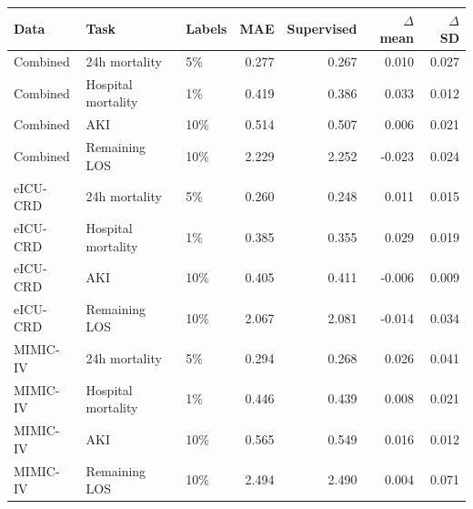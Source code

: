 \begin{tabular}{lllrrrr}
\toprule
Data & Task & Labels & MAE & Supervised & $\Delta$ mean & $\Delta$ SD \\
\midrule
Combined & 24h mortality & 5\% & 0.277 & 0.267 & 0.010 & 0.027 \\
Combined & Hospital mortality & 1\% & 0.419 & 0.386 & 0.033 & 0.012 \\
Combined & AKI & 10\% & 0.514 & 0.507 & 0.006 & 0.021 \\
Combined & Remaining LOS & 10\% & 2.229 & 2.252 & -0.023 & 0.024 \\
eICU-CRD & 24h mortality & 5\% & 0.260 & 0.248 & 0.011 & 0.015 \\
eICU-CRD & Hospital mortality & 1\% & 0.385 & 0.355 & 0.029 & 0.019 \\
eICU-CRD & AKI & 10\% & 0.405 & 0.411 & -0.006 & 0.009 \\
eICU-CRD & Remaining LOS & 10\% & 2.067 & 2.081 & -0.014 & 0.034 \\
MIMIC-IV & 24h mortality & 5\% & 0.294 & 0.268 & 0.026 & 0.041 \\
MIMIC-IV & Hospital mortality & 1\% & 0.446 & 0.439 & 0.008 & 0.021 \\
MIMIC-IV & AKI & 10\% & 0.565 & 0.549 & 0.016 & 0.012 \\
MIMIC-IV & Remaining LOS & 10\% & 2.494 & 2.490 & 0.004 & 0.071 \\
\bottomrule
\end{tabular}
